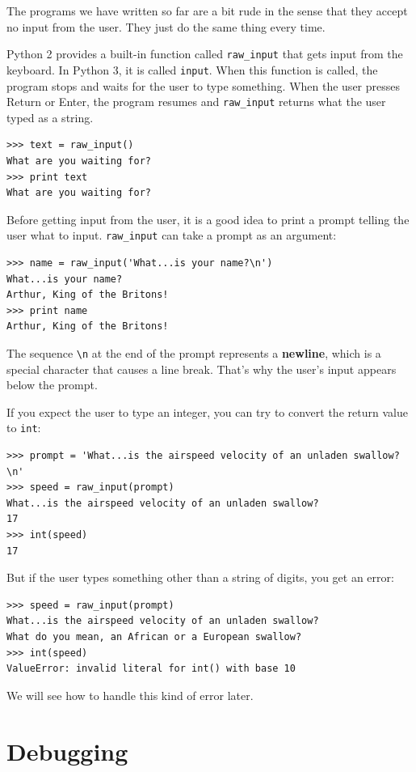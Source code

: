 \documentclass[10pt]{book}
\begin{document}
The programs we have written so far are a bit rude in the sense that
they accept no input from the user.  They just do the same thing every
time.

Python 2 provides a built-in function called \verb"raw_input" that gets
input from the keyboard.  In Python 3, it is called
  {\tt input}.  When this function is called, the program stops and
waits for the user to type something.  When the user presses {\sf
  Return} or {\sf Enter}, the program resumes and \verb"raw_input"
returns what the user typed as a string.

\begin{verbatim}
>>> text = raw_input()
What are you waiting for?
>>> print text
What are you waiting for?
\end{verbatim}
%
Before getting input from the user, it is a good idea to print a
prompt telling the user what to input.  \verb"raw_input" can take a
prompt as an argument:

\begin{verbatim}
>>> name = raw_input('What...is your name?\n')
What...is your name?
Arthur, King of the Britons!
>>> print name
Arthur, King of the Britons!
\end{verbatim}
%
The sequence \verb"\n" at the end of the prompt represents a {\bf newline},
which is a special character that causes a line break.
That's why the user's input appears below the prompt.

If you expect the user to type an integer, you can try to convert
the return value to {\tt int}:

\begin{verbatim}
>>> prompt = 'What...is the airspeed velocity of an unladen swallow?\n'
>>> speed = raw_input(prompt)
What...is the airspeed velocity of an unladen swallow?
17
>>> int(speed)
17
\end{verbatim}
%
But if the user types something other than a string of digits,
you get an error:

\begin{verbatim}
>>> speed = raw_input(prompt)
What...is the airspeed velocity of an unladen swallow?
What do you mean, an African or a European swallow?
>>> int(speed)
ValueError: invalid literal for int() with base 10
\end{verbatim}
%
We will see how to handle this kind of error later.


\section{Debugging}
\label{whitespace}
\end{document}
